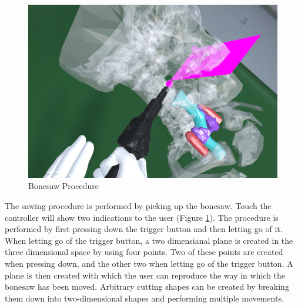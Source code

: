 \begin{figure}[ht!]
    \centering
    \includegraphics[width=\linewidth]{images/implementation/features/procedures/bonesaw.png}
    \caption{\label{fig::FeatureBoneSaw} Bonesaw Procedure}
\end{figure}

The sawing procedure is performed by picking up the bonesaw.
Touch the controller will show two indications to the user (Figure \ref{fig::FeatureBoneSaw}).
The procedure is performed by first pressing down the trigger button and then letting go of it.
When letting go of the trigger button, a two dimensianal plane is created in the three dimensional space by using four points.
Two of these points are created when pressing down, and the other two when letting go of the trigger button.
A plane is then created with which the user can reproduce the way in which the bonesaw has been moved.
Arbitrary cutting shapes can be created by breaking them down into two-dimensional shapes and performing multiple movements.